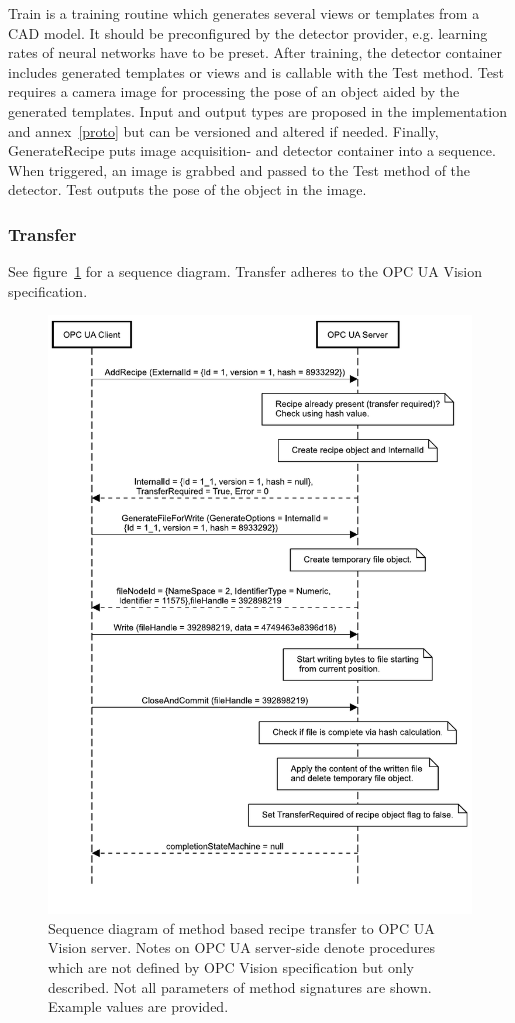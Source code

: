 Train is a training routine which generates several views or templates from a CAD model. It should be preconfigured by the detector provider, e.g. learning rates of neural networks have to be preset. After training, the detector container includes generated templates or views and is callable with the Test method.  Test requires a camera image for processing the pose of an object aided by the generated templates.  Input and output types are proposed in the implementation and annex~\ref{proto} but can be versioned and altered if needed. Finally, GenerateRecipe puts image acquisition- and detector container into a sequence. When triggered, an image is grabbed and passed to the Test method of the detector. Test outputs the pose of the object in the image.

\subsubsection{Transfer}
See figure~\ref{fig:runtimeviewgen} for a sequence diagram. Transfer adheres to the OPC UA Vision specification.
\begin{figure}
    \centering
    \includegraphics[height=0.9\textheight]{img/OPCUAVisionAddRecipe.pdf}
    \caption[Sequence diagram of method based recipe transfer]{Sequence diagram of method based recipe transfer to OPC UA Vision server. Notes on OPC UA server-side denote procedures which are not defined by OPC Vision specification but only described. Not all parameters of method signatures are shown. Example values are provided.}
    \label{fig:runtimeviewgen}
\end{figure}
